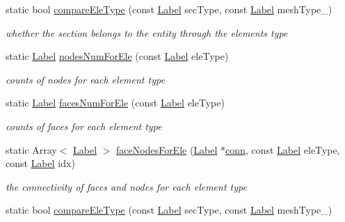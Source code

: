 \begin{DoxyCompactItemize}
static bool \hyperlink{classHSF_1_1Section_ab980393a237c4f886589726f45b34803}{compareEleType} (const \hyperlink{namespaceHSF_ae65d72be782e989396ebe5ec6ae4c2b6}{Label} secType, const \hyperlink{namespaceHSF_ae65d72be782e989396ebe5ec6ae4c2b6}{Label} meshType\_\-)
\begin{DoxyCompactList}\small\item\em whether the section belongs to the entity through the elements type \item\end{DoxyCompactList}\item 
static \hyperlink{namespaceHSF_ae65d72be782e989396ebe5ec6ae4c2b6}{Label} \hyperlink{classHSF_1_1Section_a253bd8ce6b49a2c7c46d3b2588a787a9}{nodesNumForEle} (const \hyperlink{namespaceHSF_ae65d72be782e989396ebe5ec6ae4c2b6}{Label} eleType)
\begin{DoxyCompactList}\small\item\em counts of nodes for each element type \item\end{DoxyCompactList}\item 
static \hyperlink{namespaceHSF_ae65d72be782e989396ebe5ec6ae4c2b6}{Label} \hyperlink{classHSF_1_1Section_a44cf6f64b817e7126b03d4fda4b94b1a}{facesNumForEle} (const \hyperlink{namespaceHSF_ae65d72be782e989396ebe5ec6ae4c2b6}{Label} eleType)
\begin{DoxyCompactList}\small\item\em counts of faces for each element type \item\end{DoxyCompactList}\item 
static Array$<$ \hyperlink{namespaceHSF_ae65d72be782e989396ebe5ec6ae4c2b6}{Label} $>$ \hyperlink{classHSF_1_1Section_a6e45839e208a8e70af86e9d51a06d1cf}{faceNodesForEle} (\hyperlink{namespaceHSF_ae65d72be782e989396ebe5ec6ae4c2b6}{Label} $\ast$\hyperlink{classHSF_1_1Section_a21e40283b7ab3f9a90264724747b18b1}{conn}, const \hyperlink{namespaceHSF_ae65d72be782e989396ebe5ec6ae4c2b6}{Label} eleType, const \hyperlink{namespaceHSF_ae65d72be782e989396ebe5ec6ae4c2b6}{Label} idx)
\begin{DoxyCompactList}\small\item\em the connectivity of faces and nodes for each element type \item\end{DoxyCompactList}\item 
static bool \hyperlink{classHSF_1_1Section_af17737c4ca44540770552c8790f40897}{compareEleType} (const \hyperlink{namespaceHSF_ae65d72be782e989396ebe5ec6ae4c2b6}{Label} secType, const \hyperlink{namespaceHSF_ae65d72be782e989396ebe5ec6ae4c2b6}{Label} meshType\_\-)

\end{DoxyCompactItemize}
